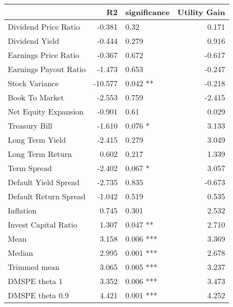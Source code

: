 \begin{tabular}{lrlr}
\toprule
{} &      R2 & significance &  Utility Gain \\
\midrule
Dividend Price Ratio  &  -0.381 &        0.32  &         0.171 \\
Dividend Yield        &  -0.444 &       0.279  &         0.916 \\
Earnings Price Ratio  &  -0.367 &       0.672  &        -0.617 \\
Earnings Payout Ratio &  -1.473 &       0.653  &        -0.247 \\
Stock Variance        & -10.577 &     0.042 ** &        -0.218 \\
Book To Market        &  -2.553 &       0.759  &        -2.415 \\
Net Equity Expansion  &  -0.901 &        0.61  &         0.029 \\
Treasury Bill         &  -1.610 &      0.076 * &         3.133 \\
Long Term Yield       &  -2.415 &       0.279  &         3.049 \\
Long Term Return      &   0.602 &       0.217  &         1.339 \\
Term Spread           &  -2.402 &      0.067 * &         3.057 \\
Default Yield Spread  &  -2.735 &       0.835  &        -0.673 \\
Default Return Spread &  -1.042 &       0.519  &         0.535 \\
Inflation             &   0.745 &       0.301  &         2.532 \\
Invest Capital Ratio  &   1.307 &     0.047 ** &         2.710 \\
Mean                  &   3.158 &    0.006 *** &         3.369 \\
Median                &   2.995 &    0.001 *** &         2.678 \\
Trimmed mean          &   3.065 &    0.005 *** &         3.237 \\
DMSPE theta 1         &   3.352 &    0.006 *** &         3.473 \\
DMSPE theta 0.9       &   4.421 &    0.001 *** &         4.252 \\
\bottomrule
\end{tabular}
